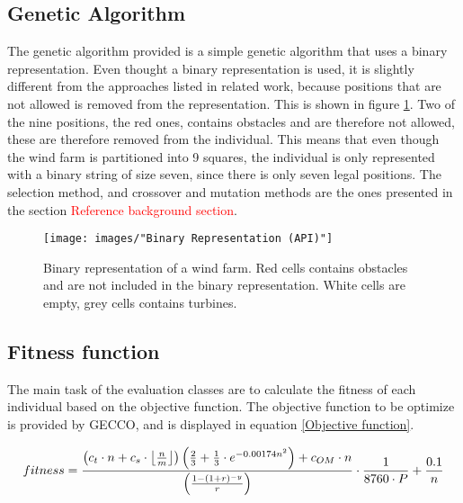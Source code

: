 \subsection{Genetic Algorithm}
The genetic algorithm provided is a simple genetic algorithm that uses a binary representation. Even thought a binary representation is used, it is slightly different from the approaches listed in related work, because positions that are not allowed is removed from the representation. This is shown in figure \ref{Binary Representation (API)}. Two of the nine positions, the red ones, contains obstacles and are therefore not allowed, these are therefore removed from the individual. This means that even though the wind farm is partitioned into 9 squares, the individual is only represented with a binary string of size seven, since there is only seven legal positions. The selection method, and crossover and mutation methods are the ones presented in the section \textcolor{red}{Reference background section}.


\begin{figure}[h!]
\begin{center}
\texttt{[image: images/"Binary Representation (API)"]}
\caption{Binary representation of a wind farm. Red cells contains obstacles and are not included in the binary representation. White cells are empty, grey cells contains turbines.}
\label{Binary Representation (API)}
\end{center}
\end{figure}


\subsection{Fitness function}


The main task of the evaluation classes are to calculate the fitness of each individual based on the objective function.  The objective function to be optimize is provided by GECCO, and is displayed in equation \ref{Objective function}.\\

\begin{small}
\begin{equation}
fitness =  \frac{ \left( c_t \cdot n + c_s \cdot \floor*{\frac{n}{m}} \right) \left( \frac{2}{3} + \frac{1}{3} \cdot e^{-0.00174n^2} \right) + c_{OM} \cdot n}{\left( \frac{1 - (1 + r)^{-y}}{r} \right) } \cdot \frac{1}{8760 \cdot P} + \frac{0.1}{n}
\label{Objective function} 
\end{equation}
\end{small}



